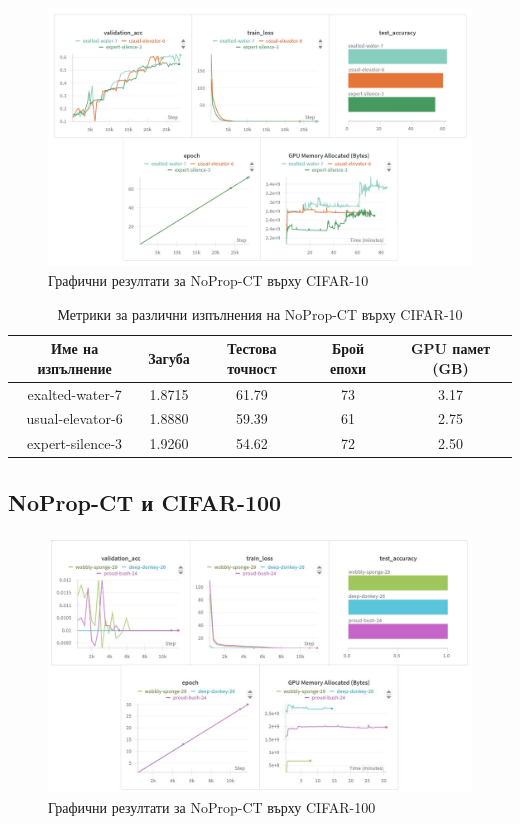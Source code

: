 \documentclass[a4paper,11pt]{article}
\begin{document}
\begin{figure}[H]
    \centering
    \includegraphics[width=6.26in,keepaspectratio]{images/NoProp-CT CIFAR-10.png}
    \caption{Графични резултати за NoProp-CT върху CIFAR-10}
\end{figure}

\begin{table}[H]
  \centering
  \renewcommand{\arraystretch}{1.5} %
  \begin{tabular}{ccccc}
    \toprule
    \textbf{Име на изпълнение} & \textbf{Загуба} & \textbf{Тестова точност} & \textbf{Брой епохи} & \textbf{GPU памет (GB)}\\
    \midrule
    exalted-water-7& 1.8715& 61.79& 73& 3.17\\
    usual-elevator-6& 1.8880& 59.39& 61& 2.75\\
    expert-silence-3& 1.9260& 54.62& 72& 2.50\\
    \bottomrule
  \end{tabular}
  \caption{Метрики за различни изпълнения на NoProp-CT върху CIFAR-10}
  \label{tab:avg_metrics_noprop_ct_cifar-10}
\end{table}

\subsection{NoProp-CT и CIFAR-100}
\begin{figure}[H]
    \centering
    \includegraphics[width=6.26in,keepaspectratio]{images/NoProp-CT CIFAR100.jpg}
    \caption{Графични резултати за NoProp-CT върху CIFAR-100}
\end{figure}
\end{document}
